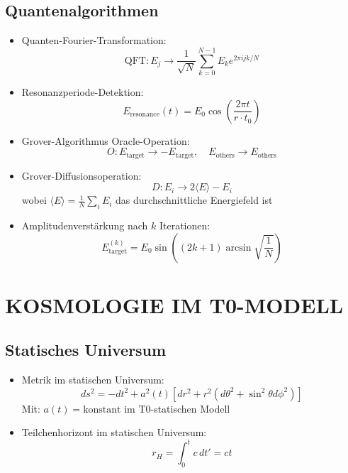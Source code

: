 \documentclass[12pt,a4paper]{article}
\begin{document}
	\subsection{Quantenalgorithmen}
	\begin{itemize}
		\item Quanten-Fourier-Transformation:
		$$\text{QFT}: E_j \rightarrow \frac{1}{\sqrt{N}} \sum_{k=0}^{N-1} E_k e^{2\pi i jk/N}$$
		
		\item Resonanzperiode-Detektion:
		$$E_{\text{resonance}}(t) = E_0 \cos\left(\frac{2\pi t}{r \cdot t_0}\right)$$
		
		\item Grover-Algorithmus Oracle-Operation:
		$$O: E_{\text{target}} \rightarrow -E_{\text{target}}, \quad E_{\text{others}} \rightarrow E_{\text{others}}$$
		
		\item Grover-Diffusionsoperation:
		$$D: E_i \rightarrow 2\langle E \rangle - E_i$$
		wobei $\langle E \rangle = \frac{1}{N}\sum_i E_i$ das durchschnittliche Energiefeld ist
		
		\item Amplitudenverst\"{a}rkung nach $k$ Iterationen:
		$$E_{\text{target}}^{(k)} = E_0 \sin\left((2k+1)\arcsin\sqrt{\frac{1}{N}}\right)$$
	\end{itemize}
	
	\section{KOSMOLOGIE IM T0-MODELL}
	
	\subsection{Statisches Universum}
\begin{itemize}
	\item Metrik im statischen Universum:
	$$ds^2 = -dt^2 + a^2(t)[dr^2 + r^2(d\theta^2 + \sin^2\theta d\phi^2)]$$
	Mit: $a(t) = \text{konstant}$ im T0-statischen Modell
	
	\item Teilchenhorizont im statischen Universum:
	$$r_H = \int_0^t c \, dt' = ct$$
\end{itemize}
\end{document}
